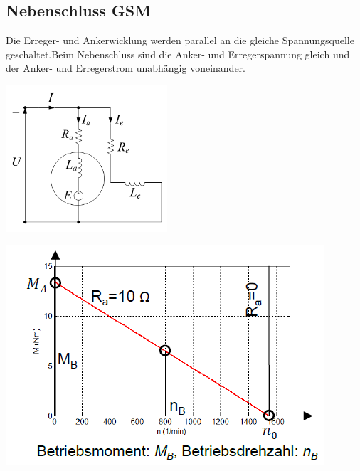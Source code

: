 \subsection{Nebenschluss GSM}
    Die Erreger- und Ankerwicklung werden parallel an die gleiche Spannungsquelle geschaltet.\newline Beim Nebenschluss sind die Anker- und Erregerspannung gleich und der Anker- und Erregerstrom unabhängig \newline voneinander. \\
    \begin{minipage}[b]{0.4\textwidth}
    	\raggedright
    	\includegraphics[width=6cm]{images/Nebenschluss_GSM.png}
    \end{minipage}
    \begin{minipage}[b]{0.5\textwidth}
    	\raggedright
    	\includegraphics[scale = 0.8]{images/KennlinieNebenschluss1}
    \end{minipage}
    
